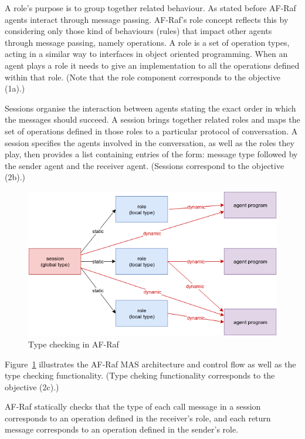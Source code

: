 \documentclass[a4paper,12pt,oneside,fleqn]{book} %
\begin{document}
A role's purpose is to group together related behaviour. As stated before
AF-Raf agents interact through message passing. AF-Raf's role concept
reflects this by considering only those kind of behaviours (rules) that
impact other agents through message passing, namely operations. A role is a
set of operation types, acting in a similar way to interfaces in object
oriented programming. When an agent plays a role it needs to give an
implementation to all the operations defined within that role. (Note that
the role component corresponds to the objective (1a).)

Sessions organise the interaction between agents stating the exact order in
which the messages should succeed. A session brings together related roles
and maps the set of operations defined in those roles to a particular
protocol of conversation. A session specifies the agents involved in the
conversation, as well as the roles they play, then provides a list
containing entries of the form: message type followed by the sender agent
and the receiver agent. (Sessions correspond to the objective (2b).)


\begin{figure}\footnotesize %
\includegraphics{typechecking.png}
\caption{Type checking in AF-Raf}
\label{fig:typechecking}
\end{figure} %

Figure~\ref{fig:typechecking} illustrates the AF-Raf MAS architecture and
control flow as well as the type checking functionality. (Type cheking
functionality corresponds to the objective (2c).)

AF-Raf statically checks that the type of each call message in a session
corresponds to an operation defined in the receiver's role, and each return
message corresponds to an operation defined in the sender's role.
\end{document}
